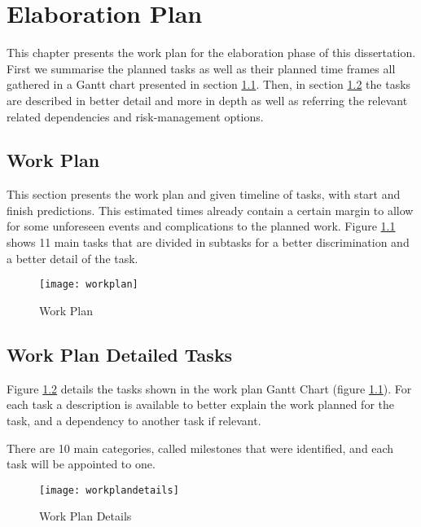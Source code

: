 
\chapter{Elaboration Plan}
\label{cha:elaboration_plan}

This chapter presents the work plan for the elaboration phase of this dissertation. First we summarise the planned tasks as well as their planned time frames all gathered in a Gantt chart presented in section \ref{sec:workplan}. Then, in section \ref{sec:workplan_details} the tasks are described in better detail and more in depth as well as referring the relevant related dependencies and risk-management options.

\section{Work Plan}
\label{sec:workplan}

This section presents the work plan and given timeline of tasks, with start and finish predictions. This estimated times already contain a certain margin to allow for some unforeseen events and complications to the planned work. Figure \ref{fig:work_plan} shows 11 main tasks that are divided in subtasks for a better discrimination and a better detail of the task.

\begin{figure}[htbp]
	\centerline{\texttt{[image: workplan]}}%
	\caption{Work Plan}
	\label{fig:work_plan}
\end{figure}

\section{Work Plan Detailed Tasks}
\label{sec:workplan_details}

Figure \ref{fig:workplan_details} details the tasks shown in the work plan Gantt Chart (figure \ref{fig:work_plan}). For each task a description is available to better explain the work planned for the task, and a dependency to another task if relevant.

There are 10 main categories, called milestones that were identified, and each task will be appointed to one.

\begin{figure}[htbp]
	\centerline{\texttt{[image: workplandetails]}}%
	\caption{Work Plan Details}
	\label{fig:workplan_details}
\end{figure}